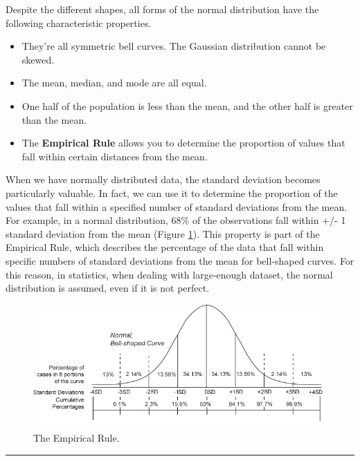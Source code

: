 \documentclass[
]{svmono}
\begin{document}
Despite the different shapes, all forms of the normal distribution have
the following characteristic properties.

\begin{itemize}
\item
  They're all symmetric bell curves. The Gaussian distribution cannot
  be skewed.
\item
  The mean, median, and mode are all equal.
\item
  One half of the population is less than the mean, and the other half
  is greater than the mean.
\item
  The \textbf{Empirical Rule} allows you to determine the proportion of
  values that fall within certain distances from the mean.
\end{itemize}

When we have normally distributed data, the standard deviation becomes
particularly valuable. In fact, we can use it to determine the
proportion of the values that fall within a specified number of standard
deviations from the mean. For example, in a normal distribution, 68\% of
the observations fall within +/- 1 standard deviation from the mean
(Figure \ref{fig:rule}). This property is part of the Empirical Rule, which
describes the percentage of the data that fall within specific numbers
of standard deviations from the mean for bell-shaped curves. For this
reason, in statistics, when dealing with large-enough dataset, the
normal distribution is assumed, even if it is not perfect.

\begin{figure}[H]

{\centering \includegraphics[width=0.8\linewidth,]{images/Senza titolo} 

}

\caption{The Empirical Rule.}\label{fig:rule}
\end{figure}

\begin{center}\rule{0.5\linewidth}{0.5pt}\end{center}
\end{document}
